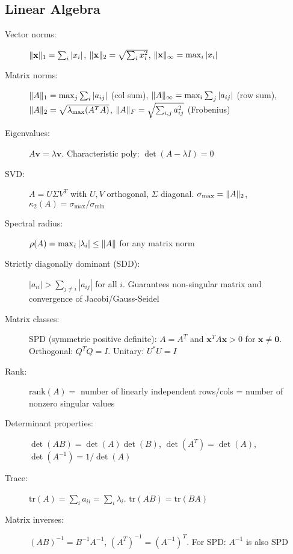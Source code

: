 \documentclass[a4paper,10pt,landscape]{article}
\DeclarePairedDelimiter{\norm}{\lVert}{\rVert}
\begin{document}
\begin{multicols*}{3}
    \scriptsize
    \section*{Linear Algebra}
    \begin{description}
        \item[Vector norms:] $\norm{\mathbf{x}}_1 = \sum_i |x_i|$, $\norm{\mathbf{x}}_2 = \sqrt{\sum_i x_i^2}$, $\norm{\mathbf{x}}_\infty = \max_i |x_i|$
        \item[Matrix norms:] $\norm{A}_1 = \max_j \sum_i |a_{ij}|$ (col sum), $\norm{A}_\infty = \max_i \sum_j |a_{ij}|$ (row sum), $\norm{A}_2 = \sqrt{\lambda_{\max}(A^TA)}$, $\norm{A}_F = \sqrt{\sum_{i,j} a_{ij}^2}$ (Frobenius)
        \item[Eigenvalues:] $A\mathbf{v} = \lambda\mathbf{v}$. Characteristic poly: $\det(A-\lambda I) = 0$
        \item[SVD:] $A = U\Sigma V^T$ with $U,V$ orthogonal, $\Sigma$ diagonal. $\sigma_{\max} = \norm{A}_2$, $\kappa_2(A) = \sigma_{\max}/\sigma_{\min}$
        \item[Spectral radius:] $\rho(A) = \max_i |\lambda_i| \leq \norm{A}$ for any matrix norm
        \item[Strictly diagonally dominant (SDD):] $|a_{ii}| > \sum_{j \neq i} |a_{ij}|$ for all $i$. Guarantees non-singular matrix and convergence of Jacobi/Gauss-Seidel
        \item[Matrix classes:] SPD (symmetric positive definite): $A = A^T$ and $\mathbf{x}^T A \mathbf{x} > 0$ for $\mathbf{x} \neq \mathbf{0}$. Orthogonal: $Q^TQ = I$. Unitary: $U^*U = I$
        \item[Rank:] $\text{rank}(A) = $ number of linearly independent rows/cols = number of nonzero singular values
        \item[Determinant properties:] $\det(AB) = \det(A)\det(B)$, $\det(A^T) = \det(A)$, $\det(A^{-1}) = 1/\det(A)$
        \item[Trace:] $\text{tr}(A) = \sum_i a_{ii} = \sum_i \lambda_i$. $\text{tr}(AB) = \text{tr}(BA)$
        \item[Matrix inverses:] $(AB)^{-1} = B^{-1}A^{-1}$, $(A^T)^{-1} = (A^{-1})^T$. For SPD: $A^{-1}$ is also SPD
    \end{description}


\end{multicols*}
\end{document}
